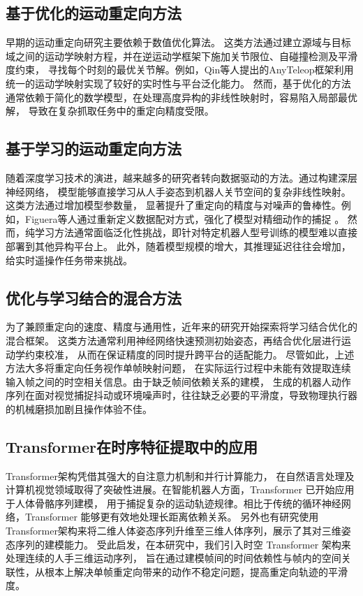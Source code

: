 \subsection{基于优化的运动重定向方法}
早期的运动重定向研究主要依赖于数值优化算法。
这类方法通过建立源域与目标域之间的运动学映射方程，并在逆运动学框架下施加关节限位、自碰撞检测及平滑度约束，
寻找每个时刻的最优关节解。例如，Qin等人提出的AnyTeleop框架利用统一的运动学映射实现了较好的实时性与平台泛化能力。
然而，基于优化的方法通常依赖于简化的数学模型，在处理高度异构的非线性映射时，容易陷入局部最优解，
导致在复杂抓取任务中的重定向精度受限。

\subsection{基于学习的运动重定向方法}
随着深度学习技术的演进，越来越多的研究者转向数据驱动的方法。通过构建深层神经网络，
模型能够直接学习从人手姿态到机器人关节空间的复杂非线性映射。这类方法通过增加模型参数量，
显著提升了重定向的精度与对噪声的鲁棒性。例如，Figuera等人通过重新定义数据配对方式，强化了模型对精细动作的捕捉
\cite{figueraRedefiningDataPairing2024}。
然而，纯学习方法通常面临泛化性挑战，即针对特定机器人型号训练的模型难以直接部署到其他异构平台上。
此外，随着模型规模的增大，其推理延迟往往会增加，给实时遥操作任务带来挑战。

\subsection{优化与学习结合的混合方法}
为了兼顾重定向的速度、精度与通用性，近年来的研究开始探索将学习结合优化的混合框架。
这类方法通常利用神经网络快速预测初始姿态，再结合优化层进行运动学约束校准，
从而在保证精度的同时提升跨平台的适配能力\cite{zhangKinematicMotionRetargeting2022}。
尽管如此，上述方法大多将重定向任务视作单帧映射问题，
在实际运行过程中未能有效提取连续输入帧之间的时空相关信息。由于缺乏帧间依赖关系的建模，
生成的机器人动作序列在面对视觉捕捉抖动或环境噪声时，往往缺乏必要的平滑度，导致物理执行器的机械磨损加剧且操作体验不佳。

\subsection{Transformer在时序特征提取中的应用}
Transformer架构凭借其强大的自注意力机制和并行计算能力，
在自然语言处理及计算机视觉领域取得了突破性进展\cite{vaswaniAttentionAllYou2017}。在智能机器人方面，Transformer 已开始应用于人体骨骼序列建模，
用于捕捉复杂的运动轨迹规律。相比于传统的循环神经网络，Transformer 能够更有效地处理长距离依赖关系。
另外也有研究使用Transformer架构来将二维人体姿态序列升维至三维人体序列，展示了其对三维姿态序列的建模能力。
受此启发，在本研究中，我们引入时空 Transformer 架构来处理连续的人手三维运动序列，
旨在通过建模帧间的时间依赖性与帧内的空间关联性，从根本上解决单帧重定向带来的动作不稳定问题，提高重定向轨迹的平滑度。

